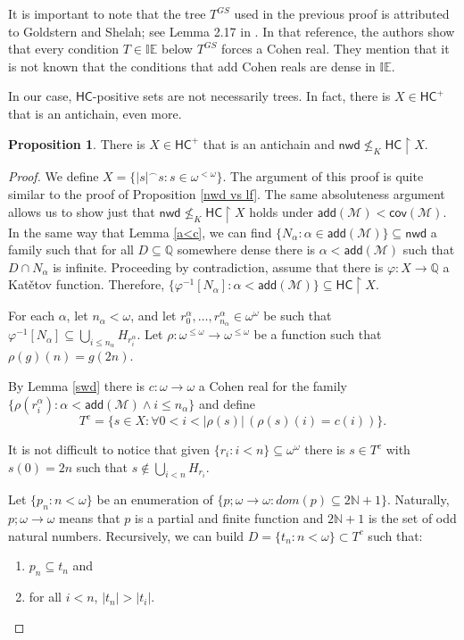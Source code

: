 \documentclass{amsart}
\theoremstyle{definition}
\newtheorem{proposition}[theorem]{Proposition}
\theoremstyle{remark}
\numberwithin{equation}{section}
\newcommand{\nwd}{\mathsf{nwd}}
\newcommand{\hc}{\mathsf{HC}}
\newcommand{\add}{\mathsf{add}}
\newcommand{\cov}{\mathsf{cov}}
\newcommand{\restr}[2]{#1\upharpoonright {#2}}
\begin{document}
    It is important to note that the tree $T^{GS}$ used in the previous proof is attributed to Goldstern and Shelah; see Lemma 2.17 in \cite{fullmil}. In that reference, the authors show that every condition $T\in\mathbb{IE}$ below $T^{GS}$ forces a Cohen real. They mention that it is not known that the conditions that add Cohen reals are dense in $\mathbb{IE}$.

    In our case, $\hc$-positive sets are not necessarily trees. In fact, there is $X\in \hc^+$ that is an antichain, even more.

    \begin{proposition} \label{nwd vs antich}
        There is $X\in \hc^+$ that is an antichain and $\nwd\not\leq_K\restr{\hc}{X}$.
    \end{proposition}
    \begin{proof}
        We define $X=\{|s|^\frown s:s\in\omega^{<\omega}\}$. 
        The argument of this proof is quite similar to the proof of Proposition \ref{nwd vs lf}. The same absoluteness argument allows us to show just that $\nwd\not\leq_K\restr{\hc}{X}$ holds under $\add(\mathcal{M})<\cov(\mathcal{M})$. In the same way that Lemma \ref{a<c}, we can find $\{N_\alpha:\alpha\in \add(\mathcal{M})\}\subseteq\nwd$ a  family such that for all $D\subseteq \mathbb{Q}$ somewhere dense there is $\alpha<\add(\mathcal{M})$ such that $D\cap N_\alpha$ is infinite. Proceeding by contradiction, assume that there is $\varphi:X \rightarrow \mathbb{Q}$ a Kat\v{e}tov function. Therefore, $\{\varphi^{-1}[N_\alpha]:\alpha<\add(\mathcal{M})\} \subseteq \hc\upharpoonright X$.
        
        For each $\alpha$, let $n_\alpha<\omega$, and let $r_0^\alpha, \dots, r_{n_\alpha}^\alpha\in \omega^\omega$ be such that $\varphi^{-1}[N_\alpha] \subseteq \bigcup_{i\leq n_\alpha} H_{r_i^\alpha}$. Let $\rho:\omega^{\leq \omega}\rightarrow\omega^{\leq \omega}$ be a function such that $\rho(g)(n)=g(2n)$.

        By Lemma \ref{swd} there is $c:\omega\rightarrow \omega$ a Cohen real for the family $\{\rho(r^\alpha_i):\alpha<\add(\mathcal{M}) \wedge i\leq n_\alpha\}$ and define
        \[
        T^{c}=\{s\in X: \forall 0<i<|\rho(s)| \,(\rho(s)(i)=c(i))\}.
        \]

        It is not difficult to notice that given $\{r_i:i<n\}\subseteq \omega^\omega$ there is $s\in T^c$ with $s(0)=2n$ such that $s\notin \bigcup_{i<n}H_{r_i}$.

        Let $\{p_n:n<\omega\}$ be an enumeration of $\{p;\omega\to\omega : dom(p)\subseteq 2\mathbb{N}+1\}$. Naturally, $p;\omega\to\omega$ means that $p$ is a partial and finite function and $2\mathbb{N}+1$ is the set of odd natural numbers. Recursively, we can build $D=\{t_n:n<\omega\}\subset T^c$ such that:
        \begin{enumerate}
            \item $p_n\subseteq t_n$ and
            \item for all $i<n$, $|t_n|>|t_i|$.
        \end{enumerate}


\end{proof}
\end{document}
